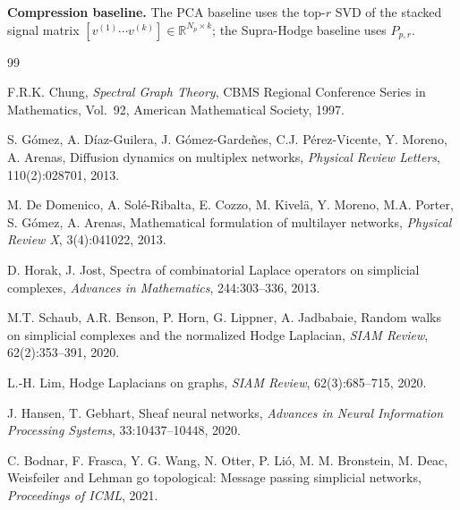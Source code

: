 \documentclass[11pt]{article}
\theoremstyle{definition}
\theoremstyle{remark}
\newcommand{\R}{\mathbb{R}}
\newcommand{\Pp}{P_{p,r}}
\begin{document}
\textbf{Compression baseline.} The PCA baseline uses the top-$r$ SVD of the
stacked signal matrix $[v^{(1)}\cdots v^{(k)}]\in\R^{N_p\times k}$; the
Supra-Hodge baseline uses $\Pp$.

\begin{thebibliography}{99}

F.R.K. Chung,
\textit{Spectral Graph Theory},
CBMS Regional Conference Series in Mathematics, Vol.~92,
American Mathematical Society, 1997.

S. G{\'o}mez, A. D{\'i}az-Guilera, J. G{\'o}mez-Garde\~{n}es,
C.J. P{\'e}rez-Vicente, Y. Moreno, A. Arenas,
Diffusion dynamics on multiplex networks,
\textit{Physical Review Letters}, 110(2):028701, 2013.

M. De Domenico, A. Sol{\'e}-Ribalta, E. Cozzo, M. Kivel{\"a}, Y. Moreno,
M.A. Porter, S. G{\'o}mez, A. Arenas,
Mathematical formulation of multilayer networks,
\textit{Physical Review X}, 3(4):041022, 2013.

D. Horak, J. Jost,
Spectra of combinatorial Laplace operators on simplicial complexes,
\textit{Advances in Mathematics}, 244:303--336, 2013.

M.T. Schaub, A.R. Benson, P. Horn, G. Lippner, A. Jadbabaie,
Random walks on simplicial complexes and the normalized Hodge Laplacian,
\textit{SIAM Review}, 62(2):353--391, 2020.

L.-H. Lim,
Hodge Laplacians on graphs,
\textit{SIAM Review}, 62(3):685--715, 2020.

J. Hansen, T. Gebhart,
Sheaf neural networks,
\textit{Advances in Neural Information Processing Systems}, 33:10437--10448, 2020.

C. Bodnar, F. Frasca, Y. G. Wang, N. Otter, P. Li{\'o}, M. M. Bronstein, M. Deac,
Weisfeiler and Lehman go topological: Message passing simplicial networks,
\textit{Proceedings of ICML}, 2021.

\end{thebibliography}
\end{document}

